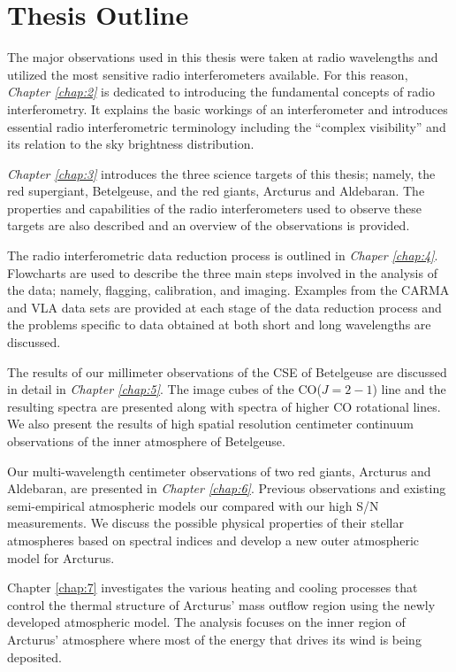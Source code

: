 \section{Thesis Outline}
The major observations used in this thesis were taken at radio wavelengths and utilized the most sensitive radio interferometers available. For this reason, \textit{Chapter \ref{chap:2}} is dedicated to introducing the fundamental concepts of radio interferometry. It explains the basic workings of an interferometer and introduces essential radio interferometric  terminology including the ``complex visibility'' and its relation to the sky brightness distribution.

\textit{Chapter \ref{chap:3}} introduces the three science targets of this thesis; namely, the red supergiant, Betelgeuse, and the red giants, Arcturus and Aldebaran. The properties and capabilities of the radio interferometers used to observe these targets are also described and an overview of the observations is provided.

The radio interferometric data reduction process is outlined in \textit{Chaper \ref{chap:4}}. Flowcharts are used to describe the three main steps involved in the analysis of the data; namely, flagging, calibration, and imaging. Examples from the CARMA and VLA data sets are provided at each stage of the data reduction process and the problems specific to data obtained at both short and long wavelengths are discussed. 

The results of our millimeter observations of the CSE of Betelgeuse are discussed in detail in \textit{Chapter \ref{chap:5}}. The image cubes of the CO($J=2-1$) line and the resulting spectra are presented along with spectra of higher CO rotational lines. We also present the results of high spatial resolution centimeter continuum observations of the inner atmosphere of Betelgeuse.

Our multi-wavelength centimeter observations of two red giants, Arcturus and Aldebaran, are presented in \textit{Chapter \ref{chap:6}}. Previous observations and existing semi-empirical atmospheric models our compared with our high S/N measurements. We discuss the possible physical properties of their stellar atmospheres based on spectral indices and develop a new outer atmospheric model for Arcturus.

Chapter \ref{chap:7} investigates the various heating and cooling processes that control the thermal structure of Arcturus' mass outflow region using the newly developed atmospheric model. The analysis focuses on the inner region of Arcturus' atmosphere where most of the energy that drives its wind is being deposited. 


